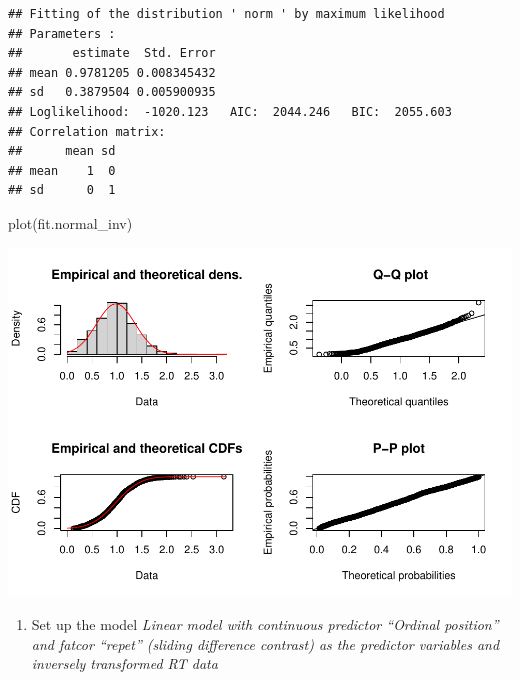 \documentclass[
]{article}
\newenvironment{Shaded}{\begin{snugshade}}{\end{snugshade}}
\newcommand{\AttributeTok}[1]{\textcolor[rgb]{0.77,0.63,0.00}{#1}}
\newcommand{\CommentTok}[1]{\textcolor[rgb]{0.56,0.35,0.01}{\textit{#1}}}
\newcommand{\FunctionTok}[1]{\textcolor[rgb]{0.00,0.00,0.00}{#1}}
\newcommand{\NormalTok}[1]{#1}
\newcommand{\OtherTok}[1]{\textcolor[rgb]{0.56,0.35,0.01}{#1}}
\newcommand{\SpecialCharTok}[1]{\textcolor[rgb]{0.00,0.00,0.00}{#1}}
\newcommand{\StringTok}[1]{\textcolor[rgb]{0.31,0.60,0.02}{#1}}
\providecommand{\tightlist}{%
  \setlength{\itemsep}{0pt}\setlength{\parskip}{0pt}}
\begin{document}
\begin{Shaded}
\end{Shaded}

\begin{verbatim}
## Fitting of the distribution ' norm ' by maximum likelihood 
## Parameters : 
##       estimate  Std. Error
## mean 0.9781205 0.008345432
## sd   0.3879504 0.005900935
## Loglikelihood:  -1020.123   AIC:  2044.246   BIC:  2055.603 
## Correlation matrix:
##      mean sd
## mean    1  0
## sd      0  1
\end{verbatim}

\begin{Shaded}
\begin{Highlighting}[]
\FunctionTok{plot}\NormalTok{(fit.normal\_inv)}
\end{Highlighting}
\end{Shaded}

\includegraphics{01_CSI_online_aphasia_power_analysis_summary_files/figure-latex/RT distributions2-3.pdf}

\begin{enumerate}
\def\labelenumi{\alph{enumi})}
\setcounter{enumi}{2}
\tightlist
\item
  Set up the model \emph{Linear model with continuous predictor
  ``Ordinal position'' and fatcor ``repet'' (sliding difference
  contrast) as the predictor variables and inversely transformed RT
  data}
\end{enumerate}
\end{document}
